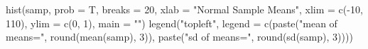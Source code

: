 \begin{Schunk}
\begin{Sinput}
 hist(samp, prob = T, breaks = 20, xlab = "Normal Sample Means", 
     xlim = c(-10, 110), ylim = c(0, 1), main = "")
 legend("topleft", legend = c(paste("mean of means=", 
     round(mean(samp), 3)), paste("sd of means=", 
     round(sd(samp), 3))))
\end{Sinput}
\end{Schunk}
